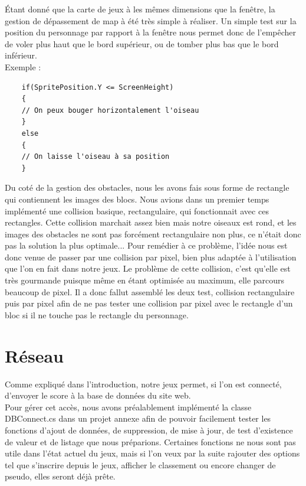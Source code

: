 \documentclass [11pt]{report}
\begin{document}
		\indent Étant donné que la carte de jeux à les mêmes dimensions que la fenêtre, la gestion de dépassement de map à été très simple à réaliser. Un simple test sur la position du personnage par rapport à la fenêtre nous permet donc de l'empêcher de voler plus haut que le bord supérieur, ou de tomber plus bas que le bord inférieur. \\
		
		Exemple :
		
		\begin{Verbatim}
	if(SpritePosition.Y <= ScreenHeight)
	{
	// On peux bouger horizontalement l'oiseau
	}
	else
	{
	// On laisse l'oiseau à sa position
	}
		\end{Verbatim}
		
				
		\indent Du coté de la gestion des obstacles, nous les avons fais sous forme de rectangle qui contiennent les images des blocs. Nous avions dans un premier temps implémenté une collision basique, rectangulaire, qui fonctionnait avec ces rectangles. Cette collision marchait assez bien mais notre oiseaux est rond, et les images des obstacles ne sont pas forcément rectangulaire non plus, ce n'était donc pas la solution la plus optimale... 
		Pour remédier à ce problème, l'idée nous est donc venue de passer par une collision par pixel, bien plus adaptée à l'utilisation que l'on en fait dans notre jeux. Le problème de cette collision, c'est qu'elle est très gourmande puisque même en étant optimisée au maximum, elle parcours beaucoup de pixel. Il a donc fallut assemblé les deux test, collision rectangulaire puis par pixel afin de ne pas tester une collision par pixel avec le rectangle d'un bloc si il ne touche pas le rectangle du personnage.
	
	\section{Réseau}
	Comme expliqué dans l'introduction, notre jeux permet, si l'on est connecté, d'envoyer le score à la base de données du site web.\\
	
	Pour gérer cet accès, nous avons préalablement implémenté la classe DBConnect.cs dans un projet annexe afin de pouvoir facilement tester les fonctions d'ajout de données, de suppression, de mise à jour, de test d'existence de valeur et de listage que nous préparions. Certaines fonctions ne nous sont pas utile dans l'état actuel du jeux, mais si l'on veux par la suite rajouter des options tel que s'inscrire depuis le jeux, afficher le classement ou encore changer de pseudo, elles seront déjà prête.\\
	
\end{document}
